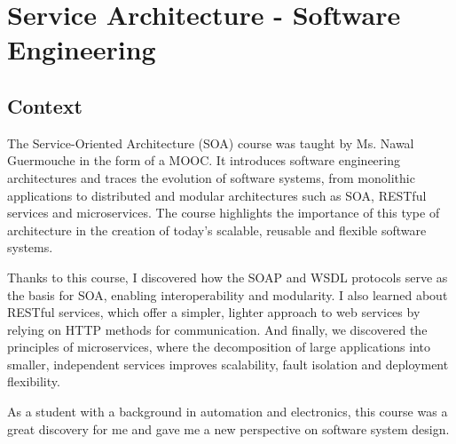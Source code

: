 \section{Service Architecture - Software Engineering}
\subsection{Context}

\indent \indent The Service-Oriented Architecture (SOA) course was taught by Ms. Nawal Guermouche in the form of a MOOC.
It introduces software engineering architectures and traces the evolution of software systems, from monolithic applications to distributed and modular architectures such as SOA, RESTful services and microservices.
The course highlights the importance of this type of architecture in the creation of today's scalable, reusable and flexible software systems.

\indent Thanks to this course, I discovered how the SOAP and WSDL protocols serve as the basis for SOA, enabling interoperability and modularity.
I also learned about RESTful services, which offer a simpler, lighter approach to web services by relying on HTTP methods for communication. 
And finally, we discovered the principles of microservices, where the decomposition of large applications into smaller, independent services improves scalability, fault isolation and deployment flexibility.

\indent As a student with a background in automation and electronics, this course was a great discovery for me and gave me a new perspective on software system design. 

